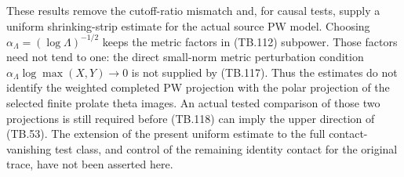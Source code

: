 \begin{remark}
These results remove the cutoff-ratio mismatch and,
for causal tests, supply a uniform shrinking-strip
estimate for the actual source PW model.
Choosing \(\alpha_\Lambda=(\log\Lambda)^{-1/2}\)
keeps the metric factors in (TB.112) subpower.
Those factors need not tend to one:
the direct small-norm metric perturbation condition
\(\alpha_\Lambda\log\max(X,Y)\to0\) is not supplied
by (TB.117).
Thus the estimates do not identify the weighted
completed PW projection with the polar projection of
the selected finite prolate theta images.
An actual tested comparison of those two projections
is still required before (TB.118) can imply the upper
direction of (TB.53).
The extension of the present uniform estimate to the
full contact-vanishing test class, and control of the
remaining identity contact for the original trace,
have not been asserted here.
\end{remark}

